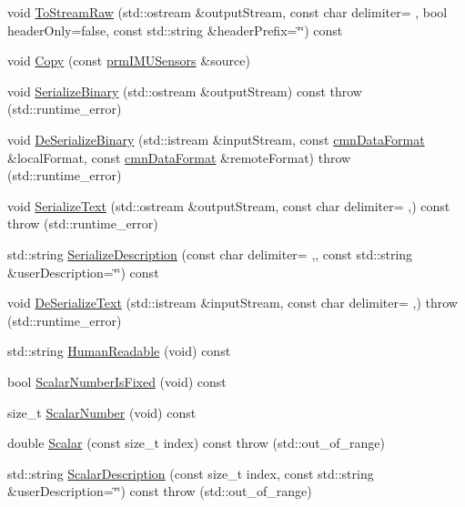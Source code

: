\begin{DoxyCompactItemize}
\item 
void \hyperlink{classprm_i_m_u_sensors_a75b10cd21c4b82a7adb129456e62938a}{To\+Stream\+Raw} (std\+::ostream \&output\+Stream, const char delimiter= \textquotesingle{} \textquotesingle{}, bool header\+Only=false, const std\+::string \&header\+Prefix=\char`\"{}\char`\"{}) const 
\item 
void \hyperlink{classprm_i_m_u_sensors_a1310c6835508c75054025702149dc58d}{Copy} (const \hyperlink{classprm_i_m_u_sensors}{prm\+I\+M\+U\+Sensors} \&source)
\item 
void \hyperlink{classprm_i_m_u_sensors_a8395402e8cd27634d35dcf04466a61f4}{Serialize\+Binary} (std\+::ostream \&output\+Stream) const   throw (std\+::runtime\+\_\+error)
\item 
void \hyperlink{classprm_i_m_u_sensors_a0cf392ee299c643893bfe41dc4d730e8}{De\+Serialize\+Binary} (std\+::istream \&input\+Stream, const \hyperlink{classcmn_data_format}{cmn\+Data\+Format} \&local\+Format, const \hyperlink{classcmn_data_format}{cmn\+Data\+Format} \&remote\+Format)  throw (std\+::runtime\+\_\+error)
\item 
void \hyperlink{classprm_i_m_u_sensors_a056c29b231c9b122b2660bd52797f339}{Serialize\+Text} (std\+::ostream \&output\+Stream, const char delimiter= \textquotesingle{},\textquotesingle{}) const   throw (std\+::runtime\+\_\+error)
\item 
std\+::string \hyperlink{classprm_i_m_u_sensors_ab10b64bb834cb66ec59fafd7a5d9a759}{Serialize\+Description} (const char delimiter= \textquotesingle{},\textquotesingle{}, const std\+::string \&user\+Description=\char`\"{}\char`\"{}) const 
\item 
void \hyperlink{classprm_i_m_u_sensors_a7273e28fe9be042bf2ba585c4387e936}{De\+Serialize\+Text} (std\+::istream \&input\+Stream, const char delimiter= \textquotesingle{},\textquotesingle{})  throw (std\+::runtime\+\_\+error)
\item 
std\+::string \hyperlink{classprm_i_m_u_sensors_afec3df332aa8e5038242c5f716c2ea56}{Human\+Readable} (void) const 
\item 
bool \hyperlink{classprm_i_m_u_sensors_a5a2c0f431b9d74c4f49d13878d4f1d1b}{Scalar\+Number\+Is\+Fixed} (void) const 
\item 
size\+\_\+t \hyperlink{classprm_i_m_u_sensors_af64f52f498b69d010b9e7450dbb14b87}{Scalar\+Number} (void) const 
\item 
double \hyperlink{classprm_i_m_u_sensors_aab8891363b3f2a86ff46079bae6034ee}{Scalar} (const size\+\_\+t index) const   throw (std\+::out\+\_\+of\+\_\+range)
\item 
std\+::string \hyperlink{classprm_i_m_u_sensors_a6d38ab9085c27a700dce23ae15129f29}{Scalar\+Description} (const size\+\_\+t index, const std\+::string \&user\+Description=\char`\"{}\char`\"{}) const   throw (std\+::out\+\_\+of\+\_\+range)
\end{DoxyCompactItemize}
